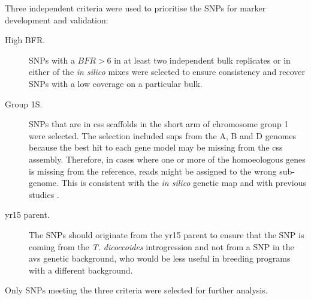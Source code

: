 Three independent criteria were used to prioritise the SNPs for marker development and validation: 

\begin{description}
\item[High BFR.] SNPs with a $BFR>6$ in at least two independent bulk replicates or in either of the \textit{in silico} mixes were selected to ensure consistency and recover SNPs with a low coverage on a particular bulk. 
\item[Group 1S.] SNPs that are in \acrshort{css} scaffolds in the short arm of chromosome group 1 were selected.
The selection included \glspl{snp} from the A, B and D genomes because the best hit to each gene model may be missing from the \gls{css} assembly.
Therefore, in cases where one or more of the homoeologous genes is missing from the reference, reads might be assigned to the wrong sub-genome.
This is consistent with the \textit{in silico} genetic map and with previous studies \citep{Murphy2009,Peng2000,Grama1997}.
\item[\acrshort{yr15} parent.] The SNPs should originate from the \acrshort{yr15} parent to ensure that the SNP is coming from the \textit{T. dicoccoides} introgression and not from a SNP in the \acrshort{avs} genetic background, who would be less useful in breeding programs with a different background.
\end{description}

Only SNPs meeting the three criteria were selected for further analysis. 

